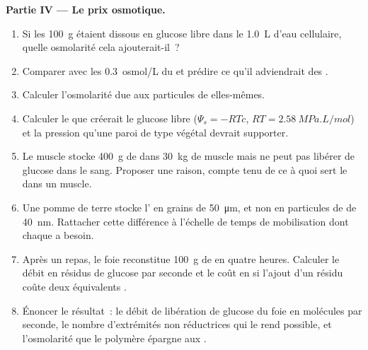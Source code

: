 \begin{problem}
\medskip
\noindent\textbf{Partie IV --- Le prix osmotique.}
\begin{enumerate}[resume]
  \item Si les \qty{100}{g} étaient dissous en glucose libre dans le
        \qty{1.0}{L} d'eau cellulaire, quelle osmolarité cela
        ajouterait-il~?
  \item Comparer avec les \qty{0.3}{osmol/L} du  et prédire ce
        qu'il adviendrait des .
  \item Calculer l'osmolarité due aux particules de 
        elles-mêmes.
  \item Calculer le  que créerait le glucose libre
        ($\Psi_s = -RTc$, $RT = \qty{2.58}{MPa.L/mol}$) et la pression
        qu'une paroi de type végétal devrait supporter.
  \item Le muscle stocke \qty{400}{g} de  dans \qty{30}{kg} de
        muscle mais ne peut pas libérer de glucose dans le sang.
        Proposer une raison, compte tenu de ce à quoi sert le 
        dans un muscle.
  \item Une pomme de terre stocke l' en grains de
        \qty{50}{\micro m}, et non en particules de  de
        \qty{40}{nm}. Rattacher cette différence à l'échelle de temps de
        mobilisation dont chaque  a besoin.
  \item Après un repas, le foie reconstitue \qty{100}{g} de  en
        quatre heures. Calculer le débit en résidus de glucose par
        seconde et le coût en  si l'ajout d'un résidu coûte deux
        équivalents .
  \item Énoncer le résultat~: le débit de libération de glucose du foie
        en molécules par seconde, le nombre d'extrémités non réductrices
        qui le rend possible, et l'osmolarité que le polymère épargne
        aux .
\end{enumerate}
\end{problem}
